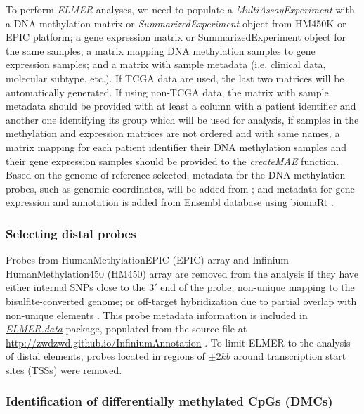 To perform \textit{ELMER} analyses, we need to populate a \textit{MultiAssayExperiment} with a DNA methylation matrix or \textit{SummarizedExperiment} object from HM450K or EPIC platform; a gene expression matrix or SummarizedExperiment object for the same samples; a matrix mapping DNA methylation samples to gene expression samples; and a matrix with sample metadata (i.e. clinical data, molecular subtype, etc.). If TCGA data are used, the last two matrices will be automatically generated.
If using non-TCGA data, the matrix with sample metadata should be provided with at least a column with a patient identifier and another one identifying its group which will be used for analysis, if samples in the methylation and expression matrices are not ordered and with same names, a matrix mapping for each patient identifier their DNA methylation samples and their gene expression samples should be provided to the \textit{createMAE} function.
Based on the genome of reference selected, metadata for the DNA methylation probes, such as genomic coordinates, will be added from   \href{http://zwdzwd.github.io/InfiniumAnnotation}{}; 
and metadata for gene expression and annotation is added from Ensembl database \cite{yates2015ensembl} using \href{http://bioconductor.org/packages/biomaRt/}{biomaRt}
\cite{durinck2009mapping}. 

\subsubsection*{Selecting distal probes} 
Probes from HumanMethylationEPIC (EPIC) array and Infinium HumanMethylation450 (HM450) array are removed from the analysis if they have either internal SNPs close to the $3'$ end of the probe; non-unique mapping to the bisulfite-converted genome; or off-target hybridization due to partial overlap with non-unique elements \cite{doi:10.1093/nar/gkw967}. This probe metadata information is
included in \href{https://github.com/tiagochst/ELMER.data}{\textit{ELMER.data}} package, populated from the source file at \url{http://zwdzwd.github.io/InfiniumAnnotation} \cite{doi:10.1093/nar/gkw967}.
To limit ELMER to the analysis of distal elements, probes located in regions of $\pm2 kb$ around transcription start sites (TSSs) were removed.

\subsubsection*{Identification of differentially methylated CpGs (DMCs)}

